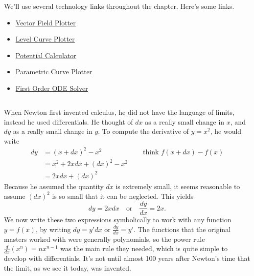%
We'll use several technology links throughout the chapter. Here's some links.
\begin{multicols}{2}
\begin{itemize}
 \item 
\href{\urlvectorfieldplotter}{Vector Field Plotter}
 \item
\href{\urllevelcurveplotter}{Level Curve Plotter}
 \item
\href{\urlpotentialcalculator}{Potential Calculator}
 \item
\href{\urlparametriccurveplotter}{Parametric Curve Plotter}
 \item
\href{\urlfirstorderodesolver}{First Order ODE Solver}
\end{itemize}
\end{multicols}


\subsection*{\ideaA}
When Newton first invented calculus, he did not have the language of limits,  instead he used differentials.  He thought of $dx$ as a really small change in $x$, and $dy$ as a really small change in $y$. To compute the derivative of $y=x^2$, he would write 
\begin{align*}
dy 
&= (x+dx)^2-x^2 \quad \quad \quad  \quad  \quad  \quad \text{think } f(x+dx)-f(x)\\
&= x^2+2xdx+(dx)^2-x^2\\
&= 2xdx+(dx)^2
\end{align*}
Because he assumed the quantity $dx$ is extremely small, it seems reasonable to assume $(dx)^2$ is so small that it can be neglected. This yields 
$$dy = 2xdx\quad\text{or}\quad \frac{dy}{dx}=2x.$$
We now write these two expressions symbolically to work with any function $y=f(x)$, by writing 
$dy = y'dx$ or $\frac{dy}{dx}=y'$.
The functions that the original masters worked with were generally polynomials, so the power rule $\frac{d}{dx}(x^n)=nx^{n-1}$ was the main rule they needed, which is quite simple to develop with differentials.  It's not until almost 100 years after Newton's time that the limit, as we see it today, was invented. 

